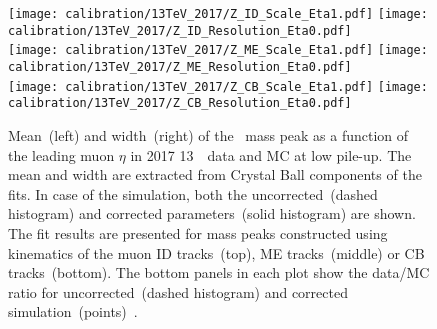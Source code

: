 	\begin{figure}[htb!]
		\begin{center}
			\texttt{[image: calibration/13TeV\_2017/Z\_ID\_Scale\_Eta1.pdf]}
			\texttt{[image: calibration/13TeV\_2017/Z\_ID\_Resolution\_Eta0.pdf]}\\
			\texttt{[image: calibration/13TeV\_2017/Z\_ME\_Scale\_Eta1.pdf]}
			\texttt{[image: calibration/13TeV\_2017/Z\_ME\_Resolution\_Eta0.pdf]}\\
			\texttt{[image: calibration/13TeV\_2017/Z\_CB\_Scale\_Eta1.pdf]}
			\texttt{[image: calibration/13TeV\_2017/Z\_CB\_Resolution\_Eta0.pdf]}
			\caption{Mean~(left) and width~(right) of the \Zmm\ mass peak as a function of the leading muon $\eta$ in 2017 13~\TeV\ data and MC at low pile-up. The mean and width are extracted from Crystal Ball components of the fits. In case of the simulation, both the uncorrected~(dashed histogram) and corrected parameters~(solid histogram) are shown. The fit results are presented for mass peaks constructed using kinematics of the muon ID tracks~(top), ME tracks~(middle) or CB tracks~(bottom). The bottom panels in each plot show the data/MC ratio for uncorrected~(dashed histogram) and corrected simulation~(points)~\cite{int_note_muons}.}
			\label{fig:calib-Z-13TeV}
		\end{center}
	\end{figure}
